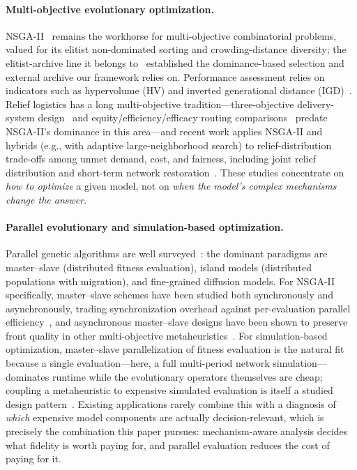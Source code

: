 \documentclass[10pt,conference,letterpaper]{IEEEtran}
\begin{document}
\paragraph{Multi-objective evolutionary optimization.}
NSGA-II~\cite{deb2002fast} remains the workhorse for multi-objective
combinatorial problems, valued for its elitist non-dominated sorting and
crowding-distance diversity; the elitist-archive line it belongs
to~\cite{zitzler1999multiobjective} established the dominance-based
selection and external archive our framework relies on. Performance
assessment relies on indicators such as hypervolume (HV) and inverted
generational distance (IGD)~\cite{zitzler2003performance}. Relief
logistics has a long multi-objective tradition---three-objective
delivery-system design~\cite{tzeng2007multiobjective} and
equity/efficiency/efficacy routing comparisons~\cite{huang2012models}
predate NSGA-II's dominance in this area---and recent work applies NSGA-II
and hybrids (e.g., with adaptive large-neighborhood search) to
relief-distribution trade-offs among unmet demand, cost, and fairness,
including joint relief distribution and short-term network
restoration~\cite{ransikarbum2022biobjective}. These studies concentrate
on \emph{how to optimize} a given model, not on \emph{when the model's
complex mechanisms change the answer}.

\paragraph{Parallel evolutionary and simulation-based optimization.}
Parallel genetic algorithms are well surveyed~\cite{cantu1998survey,
alba2002parallelism}: the dominant paradigms are master--slave (distributed
fitness evaluation), island models (distributed populations with
migration), and fine-grained diffusion models. For NSGA-II specifically,
master--slave schemes have been studied both synchronously and
asynchronously, trading synchronization overhead against per-evaluation
parallel efficiency~\cite{durillo2008study,zavoianu2015performance}, and
asynchronous master--slave designs have been shown to preserve front
quality in other multi-objective
metaheuristics~\cite{depolli2013asynchronous}. For simulation-based
optimization, master--slave parallelization of fitness evaluation is the
natural fit because a single evaluation---here, a full multi-period
network simulation---dominates runtime while the evolutionary operators
themselves are cheap; coupling a metaheuristic to expensive simulated
evaluation is itself a studied design pattern~\cite{juan2015review}. Existing applications rarely combine this with a
diagnosis of \emph{which} expensive model components are actually
decision-relevant, which is precisely the combination this paper pursues:
mechanism-aware analysis decides what fidelity is worth paying for, and
parallel evaluation reduces the cost of paying for it.
\end{document}
